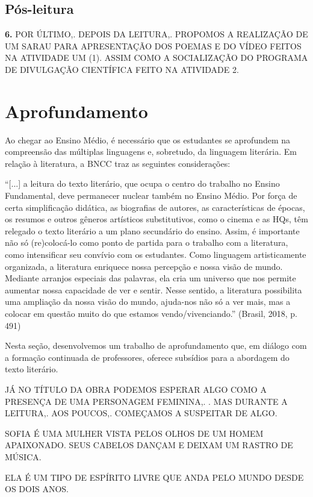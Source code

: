 \documentclass{extarticle}
\begin{document}
\subsection{Pós-leitura}

\textbf{6.} POR ÚLTIMO,. DEPOIS DA LEITURA,. PROPOMOS A REALIZAÇÃO DE UM
SARAU PARA APRESENTAÇÃO DOS POEMAS E DO VÍDEO FEITOS NA ATIVIDADE UM
(1). ASSIM COMO A SOCIALIZAÇÃO DO PROGRAMA DE DIVULGAÇÃO CIENTÍFICA
FEITO NA ATIVIDADE 2.

\section{Aprofundamento}


Ao chegar ao Ensino Médio, é necessário que os estudantes se aprofundem
na compreensão das múltiplas linguagens e, sobretudo, da linguagem
literária. Em relação à literatura, a BNCC traz as seguintes
considerações:

``{[}...{]} a leitura do texto literário, que ocupa o centro do trabalho
no Ensino Fundamental, deve permanecer nuclear também no Ensino Médio.
Por força de certa simplificação didática, as biografias de autores, as
características de épocas, os resumos e outros gêneros artísticos
substitutivos, como o cinema e as HQs, têm relegado o texto literário a
um plano secundário do ensino. Assim, é importante não só (re)colocá-lo
como ponto de partida para o trabalho com a literatura, como
intensificar seu convívio com os estudantes. Como linguagem
artisticamente organizada, a literatura enriquece nossa percepção e
nossa visão de mundo. Mediante arranjos especiais das palavras, ela cria
um universo que nos permite aumentar nossa capacidade de ver e sentir.
Nesse sentido, a literatura possibilita uma ampliação da nossa visão do
mundo, ajuda-nos não só a ver mais, mas a colocar em questão muito do
que estamos vendo/vivenciando.'' (Brasil, 2018, p. 491)

Nesta seção, desenvolvemos um trabalho de aprofundamento que, em diálogo
com a formação continuada de professores, oferece subsídios para a
abordagem do texto literário.

JÁ NO TÍTULO DA OBRA PODEMOS ESPERAR ALGO COMO A PRESENÇA DE UMA
PERSONAGEM FEMININA,. . MAS DURANTE A LEITURA,. AOS POUCOS,. COMEÇAMOS A
SUSPEITAR DE ALGO.


SOFIA É UMA MULHER VISTA PELOS OLHOS DE UM HOMEM APAIXONADO. SEUS
CABELOS DANÇAM E DEIXAM UM RASTRO DE MÚSICA.
 
ELA É UM TIPO DE ESPÍRITO LIVRE QUE ANDA PELO MUNDO DESDE OS DOIS ANOS.
 
\end{document}
